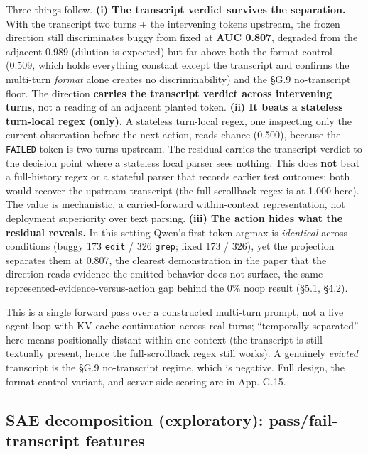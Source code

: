 \documentclass[
  11pt,
  a4paper]{article}
\begin{document}
Three things follow. \textbf{(i) The transcript verdict survives the
separation.} With the transcript two turns + the intervening tokens
upstream, the frozen direction still discriminates buggy from fixed at
\textbf{AUC 0.807}, degraded from the adjacent 0.989 (dilution is
expected) but far above both the format control (0.509, which holds
everything constant except the transcript and confirms the multi-turn
\emph{format} alone creates no discriminability) and the \S{}G.9
no-transcript floor. The direction \textbf{carries the transcript
verdict across intervening turns}, not a reading of an adjacent planted
token. \textbf{(ii) It beats a stateless turn-local regex (only).} A
stateless turn-local regex, one inspecting only the current observation
before the next action, reads chance (0.500), because the
\texttt{FAILED} token is two turns upstream. The residual carries the
transcript verdict to the decision point where a stateless local parser
sees nothing. This does \textbf{not} beat a full-history regex or a
stateful parser that records earlier test outcomes: both would recover
the upstream transcript (the full-scrollback regex is at 1.000 here).
The value is mechanistic, a carried-forward within-context
representation, not deployment superiority over text parsing.
\textbf{(iii) The action hides what the residual reveals.} In this
setting Qwen's first-token argmax is \emph{identical} across conditions
(buggy 173 \texttt{edit} / 326 \texttt{grep}; fixed 173 / 326), yet the
projection separates them at 0.807, the clearest demonstration in the
paper that the direction reads evidence the emitted behavior does not
surface, the same represented-evidence-versus-action gap behind the 0\%
noop result (\S{}5.1, \S{}4.2).

This is a single forward pass over a constructed multi-turn prompt, not
a live agent loop with KV-cache continuation across real turns;
``temporally separated'' here means positionally distant within one
context (the transcript is still textually present, hence the
full-scrollback regex still works). A genuinely \emph{evicted}
transcript is the \S{}G.9 no-transcript regime, which is negative. Full
design, the format-control variant, and server-side scoring are in App.
G.15.

\subsection{SAE decomposition (exploratory): pass/fail-transcript
features}\label{sae-decomposition-exploratory-passfail-transcript-features}
\end{document}
